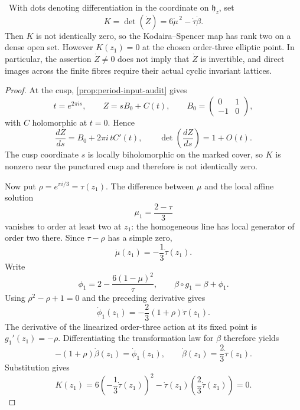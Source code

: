 \begin{proposition}
\label{prop:period-derivative-determinant}
\Verified\ With dots denoting differentiation in the coordinate on
$\mathfrak h_z$, set
\[
 K=\det(\dot Z)=6\dot\mu^{\,2}-\dot\tau\dot\beta.
\]
Then $K$ is not identically zero, so the Kodaira--Spencer map has rank two
on a dense open set.  However $K(z_1)=0$ at the chosen order-three elliptic
point.  In particular, the assertion $\dot Z\ne0$ does not imply that
$\dot Z$ is invertible, and direct images across the finite fibres require
their actual cyclic invariant lattices.
\end{proposition}

\begin{proof}
At the cusp, \cref{prop:period-input-audit} gives
\[
 t=e^{2\pi i s},\qquad Z=sB_0+C(t),\qquad
 B_0=\begin{pmatrix}0&1\\-1&0\end{pmatrix},
\]
with $C$ holomorphic at $t=0$.  Hence
\[
 \frac{dZ}{ds}=B_0+2\pi i\,tC'(t),
 \qquad
 \det\!\left(\frac{dZ}{ds}\right)=1+O(t).
\]
The cusp coordinate $s$ is locally biholomorphic on the marked cover, so
$K$ is nonzero near the punctured cusp and therefore is not identically
zero.

Now put $\rho=e^{\pi i/3}=\tau(z_1)$.  The difference between $\mu$ and
the local affine solution
\[
 \mu_1=\frac{2-\tau}{3}
\]
vanishes to order at least two at $z_1$: the homogeneous line has local
generator of order two there.  Since $\tau-\rho$ has a simple zero,
\[
 \dot\mu(z_1)=-\frac13\dot\tau(z_1).
\]
Write
\[
 \phi_1=2-\frac{6(1-\mu)^2}{\tau},
 \qquad \beta\circ g_1=\beta+\phi_1.
\]
Using $\rho^2-\rho+1=0$ and the preceding derivative gives
\[
 \dot\phi_1(z_1)
 =-\frac23(1+\rho)\dot\tau(z_1).
\]
The derivative of the linearized order-three action at its fixed point is
$g_1'(z_1)=-\rho$.  Differentiating the transformation law for $\beta$
therefore yields
\[
 -(1+\rho)\dot\beta(z_1)=\dot\phi_1(z_1),
 \qquad
 \dot\beta(z_1)=\frac23\dot\tau(z_1).
\]
Substitution gives
\[
 K(z_1)=6\left(-\frac13\dot\tau(z_1)\right)^2
 -\dot\tau(z_1)\left(\frac23\dot\tau(z_1)\right)=0.
\]
\end{proof}
